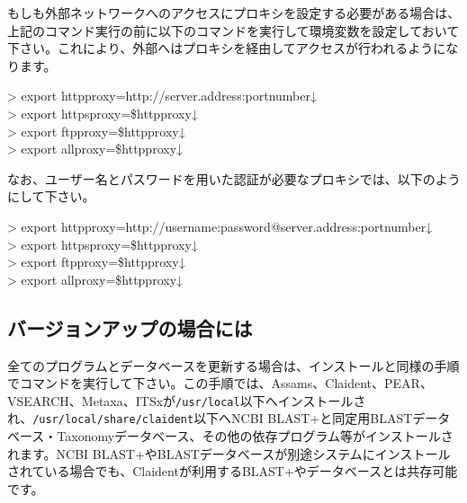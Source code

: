 \documentclass[titlepage,10pt,a4paper]{jsbook}
\newenvironment{cmd}{\begin{oframed}\raggedright\ttfamily\footnotesize\setlength{\baselineskip}{1.4em}}{\end{oframed}\vspace{-1em}}
\begin{document}
もしも外部ネットワークへのアクセスにプロキシを設定する必要がある場合は、上記のコマンド実行の前に以下のコマンドを実行して環境変数を設定しておいて下さい。これにより、外部へはプロキシを経由してアクセスが行われるようになります。
\begin{cmd}
{\textgreater} export http{\textunderscore}proxy=http://server.address:portnumber↓\\
{\textgreater} export https{\textunderscore}proxy=\$http{\textunderscore}proxy↓\\
{\textgreater} export ftp{\textunderscore}proxy=\$http{\textunderscore}proxy↓\\
{\textgreater} export all{\textunderscore}proxy=\$http{\textunderscore}proxy↓
\end{cmd}
なお、ユーザー名とパスワードを用いた認証が必要なプロキシでは、以下のようにして下さい。
\begin{cmd}
{\textgreater} export http{\textunderscore}proxy=http://username:password@server.address:portnumber↓\\
{\textgreater} export https{\textunderscore}proxy=\$http{\textunderscore}proxy↓\\
{\textgreater} export ftp{\textunderscore}proxy=\$http{\textunderscore}proxy↓\\
{\textgreater} export all{\textunderscore}proxy=\$http{\textunderscore}proxy↓
\end{cmd}

\subsection{バージョンアップの場合には}

全てのプログラムとデータベースを更新する場合は、インストールと同様の手順でコマンドを実行して下さい。この手順では、Assams、Claident、PEAR、VSEARCH、Metaxa、ITSxが\texttt{/usr/local}以下へインストールされ、\texttt{/usr/local/share/claident}以下へNCBI BLAST+と同定用BLASTデータベース・Taxonomyデータベース、その他の依存プログラム等がインストールされます。NCBI BLAST+やBLASTデータベースが別途システムにインストールされている場合でも、Claidentが利用するBLAST+やデータベースとは共存可能です。
\end{document}
